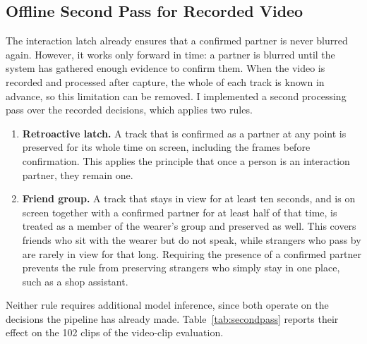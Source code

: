 \subsection{Offline Second Pass for Recorded Video}
\label{sec:results_secondpass}

The interaction latch already ensures that a confirmed partner is never blurred
again. However, it works only forward in time: a partner is blurred until the
system has gathered enough evidence to confirm them. When the video is recorded and
processed after capture, the whole of each track is known in advance, so this
limitation can be removed. I implemented a second processing pass over the recorded
decisions, which applies two rules.

\begin{enumerate}
  \item \textbf{Retroactive latch.} A track that is confirmed as a partner at any
        point is preserved for its whole time on screen, including the frames before
        confirmation. This applies the principle that once a person is an interaction
        partner, they remain one.
  \item \textbf{Friend group.} A track that stays in view for at least ten seconds,
        and is on screen together with a confirmed partner for at least half of that
        time, is treated as a member of the wearer's group and preserved as well.
        This covers friends who sit with the wearer but do not speak, while strangers
        who pass by are rarely in view for that long. Requiring the presence of a
        confirmed partner prevents the rule from preserving strangers who simply stay
        in one place, such as a shop assistant.
\end{enumerate}

Neither rule requires additional model inference, since both operate on the
decisions the pipeline has already made. Table~\ref{tab:secondpass} reports their
effect on the 102 clips of the video-clip evaluation.

\begin{table}[htbp]
\begin{singlespace}
\centering
\caption{Effect of the offline second pass on the video-clip evaluation (102 clips,
95\% Wilson confidence intervals).}
\label{tab:secondpass}
\renewcommand{\arraystretch}{1.3}
\end{singlespace}
\end{table}

